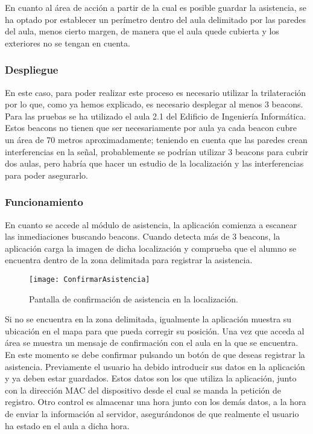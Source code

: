 En cuanto al área de acción a partir de la cual es posible guardar la asistencia, se ha optado por establecer un perímetro dentro del aula delimitado por las paredes del aula, menos cierto margen, de manera que el aula quede cubierta y los exteriores no se tengan en cuenta. 

\subsubsection{Despliegue}

En este caso, para poder realizar este proceso es necesario utilizar la trilateración por lo que, como ya hemos explicado, es necesario desplegar al menos 3 beacons. Para las pruebas se ha utilizado el aula 2.1 del Edificio de Ingeniería Informática. Estos beacons no tienen que ser necesariamente por aula ya cada beacon cubre un área de 70 metros aproximadamente; teniendo en cuenta que las paredes crean interferencias en la señal, probablemente se podrían utilizar 3 beacons para cubrir dos aulas, pero habría que hacer un estudio de la localización y las interferencias para poder asegurarlo. 

\subsubsection{Funcionamiento}


En cuanto se accede al módulo de asistencia, la aplicación comienza a escanear las inmediaciones buscando beacons. Cuando detecta más de 3 beacons, la aplicación carga la imagen de dicha localización y comprueba que el alumno se encuentra dentro de la zona delimitada para registrar la asistencia.

\begin{figure}[H]
	\centering
	\texttt{[image: ConfirmarAsistencia]}
	\caption{Pantalla de confirmación de asistencia en la localización.}
	\label{fig:confirmarAsistencia}
\end{figure}

Si no se encuentra en la zona delimitada, igualmente la aplicación muestra su ubicación en el mapa para que pueda corregir su posición. Una vez que acceda al área se muestra un mensaje de confirmación con el aula en la que se encuentra. En este momento se debe confirmar pulsando un botón de que deseas registrar la asistencia. Previamente el usuario ha debido introducir sus datos en la aplicación y ya deben estar guardados. Estos datos son los que utiliza la aplicación, junto con la dirección MAC del dispositivo desde el cual se manda la petición de registro. Otro control es almacenar una hora junto con los demás datos, a la hora de enviar la información al servidor, asegurándonos de que realmente el usuario ha estado en el aula a dicha hora.


